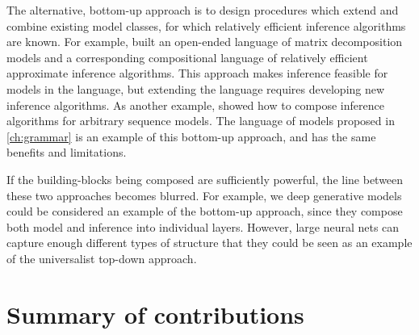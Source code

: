 The alternative, bottom-up approach is to design procedures which extend and combine existing model classes, for which relatively efficient inference algorithms are known.
For example, \citet{roger-grosse-thesis} built an open-ended language of matrix decomposition models and a corresponding compositional language of relatively efficient approximate inference algorithms.
This approach makes inference feasible for models in the language, but extending the language requires developing new inference algorithms.
As another example, \citet{christian-thesis} showed how to compose inference algorithms for arbitrary sequence models.
The language of models proposed in \cref{ch:grammar} is an example of this bottom-up approach, and has the same benefits and limitations. %

If the building-blocks being composed are sufficiently powerful, the line between these two approaches becomes blurred.
For example, we deep generative models~\citep{adams2010learning,damianou2012deep,rippel2013high,bengio2013generalized,salakhutdinov2009deep} could be considered an example of the bottom-up approach, since they compose both model and inference into individual layers.
However, large neural nets can capture enough different types of structure that they could be seen as an example of the universalist top-down approach.










\section{Summary of contributions}

